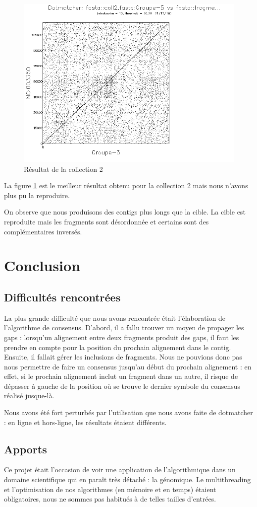 \documentclass[a4paper, 12pt, titlepage]{article}
\begin{document}
\begin{figure}
 \centering
 \includegraphics[scale=0.4]{figures/dotmatcherc2.png}
 \caption{Résultat de la collection 2}
 \label{dm2}
\end{figure}
La figure \ref{dm2} est le meilleur résultat obtenu pour la collection 2
mais nous n'avons plus pu la reproduire.

On observe que nous produisons des contigs plus longs que la cible.
La cible est reproduite mais les fragments sont désordonnée et
certains sont des complémentaires inversés.

\newpage
\section{Conclusion}
\subsection{Difficultés rencontrées}
La plus grande difficulté que nous avons rencontrée était l'élaboration de
l'algorithme de consensus.
D'abord, il a fallu trouver un moyen de propager les gaps :
lorsqu'un alignement entre deux fragments produit des gaps, il faut
les prendre en compte pour la position du prochain alignement dans le contig.
Ensuite, il fallait gérer les inclusions de fragments.
Nous ne pouvions donc pas nous permettre de faire un consensus
jusqu'au début du prochain alignement :
en effet, si le prochain alignement inclut un fragment dans un autre, il risque
de dépasser à gauche de la position où se trouve le dernier symbole du
consensus réalisé jusque-là.

Nous avons été fort perturbés par l'utilisation que nous avons faite
de dotmatcher : en ligne et hors-ligne, les résultats étaient différents.

\subsection{Apports}
Ce projet était l'occasion de voir une application de l'algorithmique dans un
domaine scientifique qui en paraît très détaché : la génomique.
Le multithreading et l'optimisation de nos algorithmes (en mémoire et en temps)
étaient obligatoires, nous ne sommes pas habitués à de telles tailles d'entrées.
\end{document}

